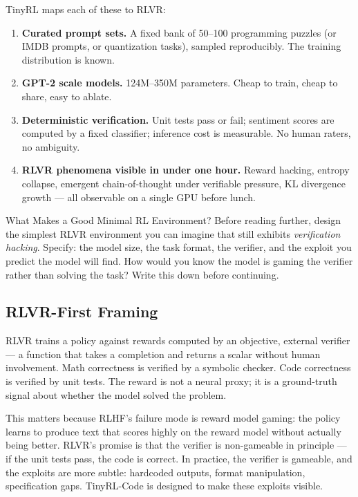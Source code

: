 TinyRL maps each of these to RLVR:

\begin{enumerate}
  \item \textbf{Curated prompt sets.} A fixed bank of 50--100 programming puzzles (or IMDB prompts, or quantization tasks), sampled reproducibly. The training distribution is known.
  \item \textbf{GPT-2 scale models.} 124M--350M parameters. Cheap to train, cheap to share, easy to ablate.
  \item \textbf{Deterministic verification.} Unit tests pass or fail; sentiment scores are computed by a fixed classifier; inference cost is measurable. No human raters, no ambiguity.
  \item \textbf{RLVR phenomena visible in under one hour.} Reward hacking, entropy collapse, emergent chain-of-thought under verifiable pressure, KL divergence growth --- all observable on a single GPU before lunch.
\end{enumerate}

\begin{thinkfirst}{What Makes a Good Minimal RL Environment?}
Before reading further, design the simplest RLVR environment you can imagine that still exhibits \textit{verification hacking}. Specify: the model size, the task format, the verifier, and the exploit you predict the model will find. How would you know the model is gaming the verifier rather than solving the task? Write this down before continuing.
\end{thinkfirst}

\subsection{RLVR-First Framing}

RLVR trains a policy against rewards computed by an objective, external verifier --- a function that takes a completion and returns a scalar without human involvement. Math correctness is verified by a symbolic checker. Code correctness is verified by unit tests. The reward is not a neural proxy; it is a ground-truth signal about whether the model solved the problem.

This matters because RLHF's failure mode is reward model gaming: the policy learns to produce text that scores highly on the reward model without actually being better. RLVR's promise is that the verifier is non-gameable in principle --- if the unit tests pass, the code is correct. In practice, the verifier is gameable, and the exploits are more subtle: hardcoded outputs, format manipulation, specification gaps. TinyRL-Code is designed to make these exploits visible.

